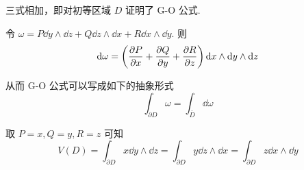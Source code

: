 三式相加，即对初等区域 $D$ 证明了 G-O 公式.

\begin{hint}
    令 $\omega=P\dd y\wedge\dd z+Q\dd z\wedge\dd x+R\dd x\wedge\dd y$. 则
$$
\mathrm{d}\omega=\left(\frac{\partial{P}}{\partial{x}}+\frac{\partial{Q}}{\partial{y}}+\frac{\partial{R}}{\partial{z}}\right)\mathrm{d} x\wedge\mathrm{d} y\wedge\mathrm{d} z
$$

    从而 G-O 公式可以写成如下的抽象形式
$$
\int_{\partial D}\omega=\int_{\overline{D}}\dd\omega
$$
\end{hint}

\begin{example}
    取 $P=x,Q=y,R=z$ 可知
$$
V(D)=\int_{\partial D}x\dd y\wedge\dd z=\int_{\partial D}y\dd z\wedge\dd x=\int_{\partial D}z\dd x\wedge\dd y
$$
\end{example}

\begin{example}[ 椭球的体积]
\end{example}